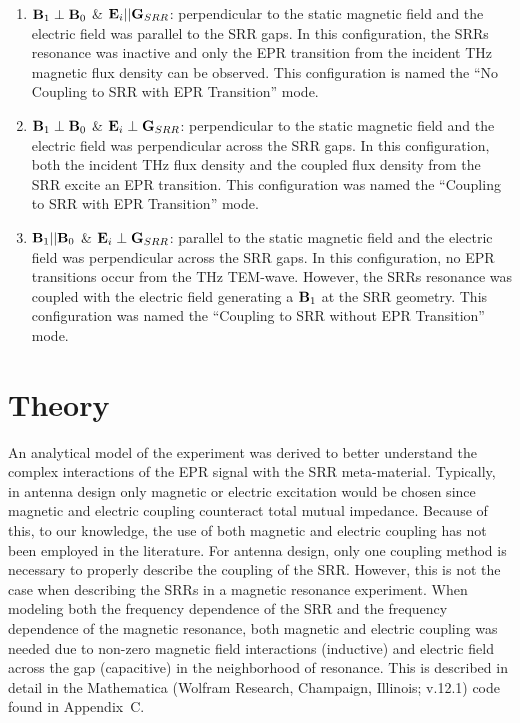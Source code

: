 \begin{enumerate}[label=(\Alph*)]
    \item $\textbf{B}_{1} \perp \textbf{B}_{0}$ \& $\textbf{E}_{i}||\textbf{G}_{SRR}$: perpendicular to the static magnetic field and the electric field was parallel to the SRR gaps. In this configuration, the SRRs resonance was inactive and only the EPR transition from the incident THz magnetic flux density can be observed. This configuration is named the ``No Coupling to SRR with EPR Transition'' mode. 
    \item $\textbf{B}_{1} \perp \textbf{B}_{0}$ \& $\textbf{E}_{i}\perp\textbf{G}_{SRR}$: perpendicular to the static magnetic field and the electric field was perpendicular across the SRR gaps. In this configuration, both the incident THz flux density and the coupled flux density from the SRR excite an EPR transition. This configuration was named the ``Coupling to SRR with EPR Transition'' mode.
    \item $\textbf{B}_{1} || \textbf{B}_{0}$ \& $\textbf{E}_{i}\perp\textbf{G}_{SRR}$: parallel to the static magnetic field and the electric field was perpendicular across the SRR gaps. In this configuration, no EPR transitions occur from the THz TEM-wave. However, the SRRs resonance was coupled with the electric field generating a $\textbf{B}_{1}$ at the SRR geometry. This configuration was named the ``Coupling to SRR without EPR Transition'' mode.
\end{enumerate}


\section{Theory}
An analytical model of the experiment was derived to better understand the complex interactions of the EPR signal with the SRR meta-material. Typically, in antenna design only magnetic \cite{srrmodel} or electric \cite{Katsarakis04} excitation would be chosen since magnetic and electric coupling counteract total mutual impedance. Because of this, to our knowledge, the use of both magnetic and electric coupling has not been employed in the literature. For antenna design, only one coupling method is necessary to properly describe the coupling of the SRR. \cite{Baena2005,DurnSindreu2012,Bojanic2014,Su2015} However, this is not the case when describing the SRRs in a magnetic resonance experiment. When modeling both the frequency dependence of the SRR and the frequency dependence of the magnetic resonance, both magnetic and electric coupling was needed due to non-zero magnetic field interactions (inductive) and electric field across the gap (capacitive) in the neighborhood of resonance. This is described in detail in the Mathematica (Wolfram Research, Champaign, Illinois; v.12.1) code  found in Appendix~C.

